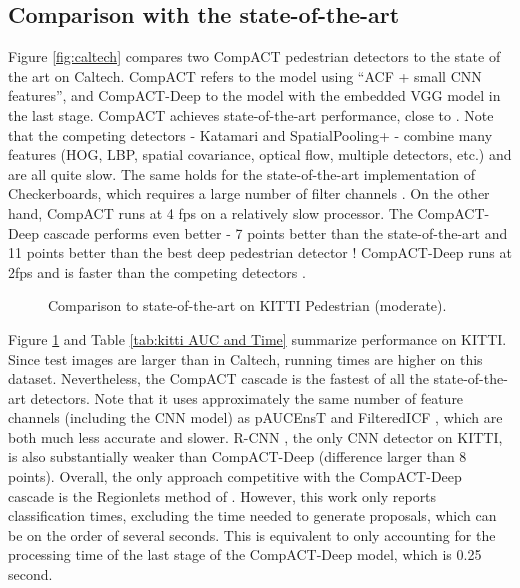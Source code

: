 \documentclass[10pt,twocolumn,letterpaper]{article}
\begin{document}
\subsection{Comparison with the state-of-the-art}
\label{subsec:pedestrian comp}

Figure \ref{fig:caltech} compares two CompACT pedestrian detectors
to the state of the art on Caltech.
CompACT refers to the model using ``ACF + small CNN features'', and
CompACT-Deep to the model with the embedded VGG model in the last stage.
CompACT  achieves state-of-the-art performance, close
to \cite{DBLP:journals/corr/ZhangBS15}. Note that the competing detectors
- Katamari \cite{Benenson2014Eccvw} and
SpatialPooling+ \cite{DBLP:conf/eccv/PaisitkriangkraiSH14} - combine
many features (HOG, LBP, spatial covariance, optical flow, multiple
detectors, etc.) and are all quite slow. The same holds for the
state-of-the-art implementation of Checkerboards, which
requires a large number of filter
channels \cite{DBLP:journals/corr/ZhangBS15}. On the other hand, CompACT
runs at 4 fps on a relatively slow processor. The CompACT-Deep cascade
performs even better - 7 points better than the
state-of-the-art \cite{DBLP:journals/corr/ZhangBS15} and 11 points better
than the best deep pedestrian detector \cite{DBLP:journals/corr/HosangOBS15}!
CompACT-Deep runs at 2fps and is faster than the competing
detectors \cite{Benenson2014Eccvw,DBLP:conf/eccv/PaisitkriangkraiSH14,
DBLP:journals/corr/ZhangBS15}.

\begin{figure}[!t]
\centering
\centerline{}
\caption{Comparison to state-of-the-art on KITTI Pedestrian (moderate).}
\label{fig:kitti}
\end{figure}

Figure \ref{fig:kitti} and Table \ref{tab:kitti AUC and Time} summarize
performance on KITTI. Since test images are larger than in Caltech,
running times are higher on this dataset. Nevertheless, the CompACT cascade
is the fastest of all the state-of-the-art detectors. Note that it uses
approximately the same number of feature channels (including the CNN model)
as pAUCEnsT \cite{DBLP:conf/eccv/PaisitkriangkraiSH14} and
FilteredICF \cite{DBLP:journals/corr/ZhangBS15}, which are both much
less accurate and slower. R-CNN \cite{DBLP:journals/corr/HosangOBS15,
DBLP:conf/cvpr/GirshickDDM14}, the only CNN detector on KITTI,
is also substantially weaker than CompACT-Deep (difference larger than 8
points). Overall, the only approach competitive with the CompACT-Deep cascade
is the Regionlets method of \cite{DBLP:conf/iccv/WangYZL13}. However,
this work only reports classification times, excluding the time needed
to generate proposals, which can be on the order of several seconds.
This is equivalent to only accounting for the processing time of
the last stage of the CompACT-Deep model, which is 0.25 second.
\end{document}
